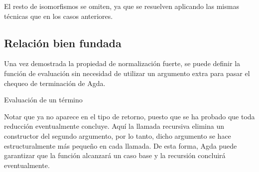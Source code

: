 
El resto de isomorfismos se omiten, ya que se resuelven aplicando las mismas técnicas que en los casos anteriores.






\subsection{Relación bien fundada}

Una vez demostrada la propiedad de normalización fuerte, se puede definir la función de evaluación sin necesidad de utilizar un argumento extra para pasar el chequeo de terminación de Agda.
  
\begin{codigo}
	Evaluación de un término
\end{codigo}

Notar que ya no aparece  en el tipo de retorno, puesto que se ha probado que toda reducción eventualmente concluye.
Aquí la llamada recursiva elimina un constructor  del segundo argumento, por lo tanto, dicho argumento se hace estructuralmente más pequeño en cada llamada.
De esta forma, Agda puede garantizar que la función alcanzará un caso base y la recursión concluirá eventualmente.

